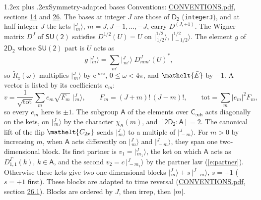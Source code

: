 \documentclass[10pt,a4paper]{article}
\makeatletter
\renewcommand\section{\@startsection{section}{1}{\z@}{-3ex plus -1ex minus -.2ex}%
  {1.2ex plus .2ex}{\normalfont\large\sffamily\bfseries\color{parttitle}}}
\numberwithin{equation}{section}
\newcommand{\eltfont}[1]{{\let\sigma\eltsigma\mathelt{#1}}}
\newcommand{\grp}[1]{\mathsf{#1}}
\newcommand{\elt}[1]{\eltfont{#1}}
\newcommand{\grpindex}[2]{[#1 : #2]}
\newcommand{\iunit}{\mathrm{i}}
\newcommand{\expe}{\mathrm{e}}
\newcommand{\irrJp}[2]{D^{(#1,#2)}}
\newcommand{\repD}[1]{D^{#1}}
\newcommand{\wignerD}[1]{D^{#1}}
\newcommand{\chiA}{\chi_{\grp{A}}}
\newcommand{\conj}[1]{{#1}^{*}}
\newcommand{\jm}[2]{\bigl\lvert{}^{#1}_{\,#2}\bigr\rangle}
\newcommand{\barred}[1]{\bar{#1}}
\newcommand{\lift}[1]{\tilde{#1}}
\makeatother
\begin{document}
\section{Symmetry-adapted bases}\label{s:bases}
Conventions: \href{../../CONVENTIONS.pdf}{CONVENTIONS.pdf}, sections \href{../../../rotation/CONVENTIONS.pdf\#conv.14}{14} and \href{../../CONVENTIONS.pdf\#conv.26}{26}.
\leavevmode\label{n:index.m}\label{n:vector.ket}The bases at integer $J$ are those of \href{../../../rotation/data/pdf/D2.pdf}{$\grp{D_{2}}$} (\texttt{integerJ}), and at half-integer $J$ the kets $\jm{J}{m}$, $m = J, J-1, \dots, -J$, carry $\irrJp{J}{+1}$. \label{n:matrix.wigner}The Wigner matrix $\wignerD{J}$ of $\grp{SU(2)}$ satisfies $\wignerD{1/2}(U) = U$ on $\jm{1/2}{1/2}$, $\jm{1/2}{-1/2}$. The element $g$ of $\grp{2D_{2}}$ whose $\grp{SU(2)}$ part is $U$ acts as
\begin{equation}\label{e:action}g\,\jm{J}{m} = \sum_{m'} \jm{J}{m'}\; \conj{\wignerD{J}_{m m'}(U)},\end{equation}
so $\lift{R}_{z}(\omega)$ multiplies $\jm{J}{m}$ by $\expe^{\iunit m\omega}$, $0 \le \omega < 4\pi$, and $\elt{\barred{E}}$ by $-1$. \label{n:index.ketcoefficient}\label{n:vector.basis.symmetry}\label{n:index.ketweight}\label{n:index.total}A vector is listed by its coefficients $e_m$:
\begin{equation}\label{e:ket}v = \frac{1}{\sqrt{\mathrm{tot}}}\sum_m e_m\sqrt{F_m}\;\jm{J}{m},\qquad F_m = (J+m)!\,(J-m)!,\qquad \mathrm{tot} = \sum_m |e_m|^2F_m,\end{equation}
so every $e_m$ here is $\pm 1$.
\leavevmode\label{n:group.A}\label{n:function.character.abelian}The subgroup $\grp{A}$ of the elements over $\grp{C_{\infty h}}$ acts diagonally on the kets, on $\jm{J}{m}$ by the character $\chiA(m)$, and $\grpindex{\grp{2D_{2}}}{\grp{A}} = 2$. The canonical lift of the flip $\elt{C_{2x}}$ sends $\jm{J}{m}$ to a multiple of $\jm{J}{-m}$. For $m > 0$ by increasing $m$, when $\grp{A}$ acts differently on $\jm{J}{m}$ and $\jm{J}{-m}$, they span one two-dimensional block. \label{n:index.partner.sign}Its first partner is $v_1 = \jm{J}{m_1}$, the ket on which $\grp{A}$ acts as $\repD{\Gamma}_{1,1}(k)$, $k \in \grp{A}$, and the second $v_2 = c\,\jm{J}{-m_1}$ by the partner law (\ref{e:partner}). \label{n:index.pair.sign}Otherwise these kets give two one-dimensional blocks $\jm{J}{m} + s\,\jm{J}{-m}$, $s = \pm 1$ ($s = +1$ first). These blocks are adapted to time reversal (\href{../../CONVENTIONS.pdf}{CONVENTIONS.pdf}, section \href{../../CONVENTIONS.pdf\#conv.26.1}{26.1}). Blocks are ordered by $J$, then irrep, then $|m|$.
\end{document}
